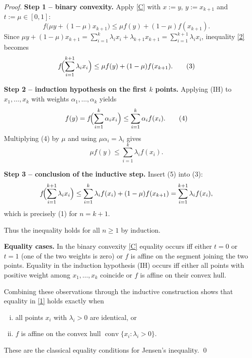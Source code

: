 \begin{proof}
\medskip\noindent\textbf{Step 1 – binary convexity.}  
Apply \eqref{C} with $x:=y$, $y:=x_{k+1}$ and $t:=\mu\in[0,1]$:
\begin{equation}
f\bigl(\mu y+(1-\mu)x_{k+1}\bigr)
\le \mu f(y)+(1-\mu)f(x_{k+1}).\tag{2}
\end{equation}
Since $\mu y+(1-\mu)x_{k+1}
      =\sum_{i=1}^{k}\lambda_i x_i+\lambda_{k+1}x_{k+1}
      =\sum_{i=1}^{k+1}\lambda_i x_i$,
inequality \eqref{2} becomes
\begin{equation}
f\!\Bigl(\sum_{i=1}^{k+1}\lambda_i x_i\Bigr)
\le \mu f(y)+(1-\mu)f(x_{k+1}).\tag{3}
\end{equation}

\medskip\noindent\textbf{Step 2 – induction hypothesis on the first $k$ points.}  
Applying (IH) to $x_{1},\dots ,x_{k}$ with weights $\alpha_{1},\dots ,\alpha_{k}$ yields
\[
f(y)=f\!\Bigl(\sum_{i=1}^{k}\alpha_i x_i\Bigr)
\le\sum_{i=1}^{k}\alpha_i f(x_i).\tag{4}
\]
Multiplying (4) by $\mu$ and using $\mu\alpha_i=\lambda_i$ gives
\begin{equation}
\mu f(y)\le\sum_{i=1}^{k}\lambda_i f(x_i).\tag{5}
\end{equation}

\medskip\noindent\textbf{Step 3 – conclusion of the inductive step.}  
Insert (5) into (3):
\[
f\!\Bigl(\sum_{i=1}^{k+1}\lambda_i x_i\Bigr)
\le\sum_{i=1}^{k}\lambda_i f(x_i)+(1-\mu)f(x_{k+1})
 =\sum_{i=1}^{k+1}\lambda_i f(x_i),
\]
which is precisely (1) for $n=k+1$.

Thus the inequality holds for all $n\ge1$ by induction.

\medskip\noindent\textbf{Equality cases.}  
In the binary convexity \eqref{C} equality occurs iff either $t=0$ or $t=1$
(one of the two weights is zero) or $f$ is affine on the segment joining the
two points.  Equality in the induction hypothesis (IH) occurs iff either
all points with positive weight among $x_{1},\dots ,x_{k}$ coincide or
$f$ is affine on their convex hull.

Combining these observations through the inductive construction shows
that equality in \eqref{1} holds exactly when

\begin{enumerate}[(i)]
\item all points $x_i$ with $\lambda_i>0$ are identical, or
\item $f$ is affine on the convex hull $\operatorname{conv}\{x_i:\lambda_i>0\}$.
\end{enumerate}
These are the classical equality conditions for Jensen’s inequality.
\qed
\end{proof}